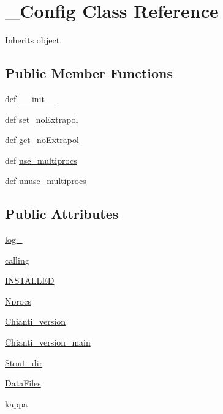 \hypertarget{classpyneb_1_1utils_1_1_config_1_1___config}{\section{\-\_\-\-Config Class Reference}
\label{classpyneb_1_1utils_1_1_config_1_1___config}
}


Inherits object.

\subsection*{Public Member Functions}
\begin{DoxyCompactItemize}
\item 
def \hyperlink{classpyneb_1_1utils_1_1_config_1_1___config_ac775ee34451fdfa742b318538164070e}{\-\_\-\-\_\-init\-\_\-\-\_\-}
\item 
def \hyperlink{classpyneb_1_1utils_1_1_config_1_1___config_abfd07a7571266836e16f60598f2e70fe}{set\-\_\-no\-Extrapol}
\item 
def \hyperlink{classpyneb_1_1utils_1_1_config_1_1___config_a6f8f55650ba62582c5985230f9212bbd}{get\-\_\-no\-Extrapol}
\item 
def \hyperlink{classpyneb_1_1utils_1_1_config_1_1___config_ae59afb01f38512ed70ba369eb26c6545}{use\-\_\-multiprocs}
\item 
def \hyperlink{classpyneb_1_1utils_1_1_config_1_1___config_a6fd86281f37dcf824308f43814b511af}{unuse\-\_\-multiprocs}
\end{DoxyCompactItemize}
\subsection*{Public Attributes}
\begin{DoxyCompactItemize}
\item 
\hyperlink{classpyneb_1_1utils_1_1_config_1_1___config_afd87151907f32bc0dc45f0171b61374e}{log\-\_\-}
\item 
\hyperlink{classpyneb_1_1utils_1_1_config_1_1___config_ab25fa7ebe84b603684dee62410c1e34c}{calling}
\item 
\hyperlink{classpyneb_1_1utils_1_1_config_1_1___config_a22ccf7c4d0168625234d7deeab717f08}{I\-N\-S\-T\-A\-L\-L\-E\-D}
\item 
\hyperlink{classpyneb_1_1utils_1_1_config_1_1___config_ade05ba3ca67358e003a5068f5c8d0943}{Nprocs}
\item 
\hyperlink{classpyneb_1_1utils_1_1_config_1_1___config_a1caebb547c4fc66d6e9136a4009d8010}{Chianti\-\_\-version}
\item 
\hyperlink{classpyneb_1_1utils_1_1_config_1_1___config_afef0404e44caca5933859d9b4b29c6ef}{Chianti\-\_\-version\-\_\-main}
\item 
\hyperlink{classpyneb_1_1utils_1_1_config_1_1___config_a9ac657913b183bf4f0ac675a5001fe7d}{Stout\-\_\-dir}
\item 
\hyperlink{classpyneb_1_1utils_1_1_config_1_1___config_a39a6ddc32b12b3b09096acc6b9761503}{Data\-Files}
\item 
\hyperlink{classpyneb_1_1utils_1_1_config_1_1___config_a05c35019108b510c24383c505ab98b92}{kappa}
\end{DoxyCompactItemize}

